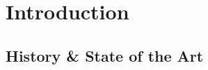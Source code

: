 \documentclass[\main/main.tex]{subfiles}
\begin{document}
\chapter{Introduction}\label{ch:introduction}

\section{History \& State of the Art}
\end{document}
